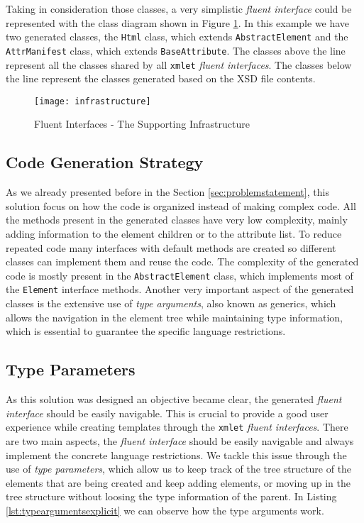 \noindent
Taking in consideration those classes, a very simplistic \textit{fluent interface} could be represented with the class diagram shown in Figure \ref{img:infrastructure}. In this example we have two generated classes, the \texttt{Html} class, which extends \texttt{AbstractElement} and the \texttt{AttrManifest} class, which extends \texttt{BaseAttribute}. The classes above the line represent all the classes shared by all \texttt{xmlet} \textit{fluent interfaces}. The classes below the line represent the classes generated based on the \ac{XSD} file contents.

\begin{figure}[H]
	\centering
	\texttt{[image: infrastructure]}
	\caption{Fluent Interfaces - The Supporting Infrastructure}
	\label{img:infrastructure}
\end{figure}

\subsection{Code Generation Strategy}
\label{sec:codegenerationstrategy}

As we already presented before in the Section \ref{sec:problemstatement}, this solution focus on how the code is organized instead of making complex code. All the methods present in the generated classes have very low complexity, mainly adding information to the element children or to the attribute list. To reduce repeated code many interfaces with default methods are created so different classes can implement them and reuse the code. The complexity of the generated code is mostly present in the \texttt{AbstractElement} class, which implements most of the \texttt{Element} interface methods. Another very important aspect of the generated classes is the extensive use of \textit{type arguments}, also known as generics, which allows the navigation in the element tree while maintaining type information, which is essential to guarantee the specific language restrictions.

\subsection{Type Parameters}
\label{sec:typeparameters}

As this solution was designed an objective became clear, the generated \textit{fluent interface} should be easily navigable. This is crucial to provide a good user experience while creating templates through the \texttt{xmlet} \textit{fluent interfaces}. There are two main aspects, the \textit{fluent interface} should be easily navigable and always implement the concrete language restrictions. We tackle this issue through the use of \textit{type parameters}, which allow us to keep track of the tree structure of the elements that are being created and keep adding elements, or moving up in the tree structure without loosing the type information of the parent. In Listing \ref{lst:typeargumentsexplicit} we can observe how the type arguments work. 

